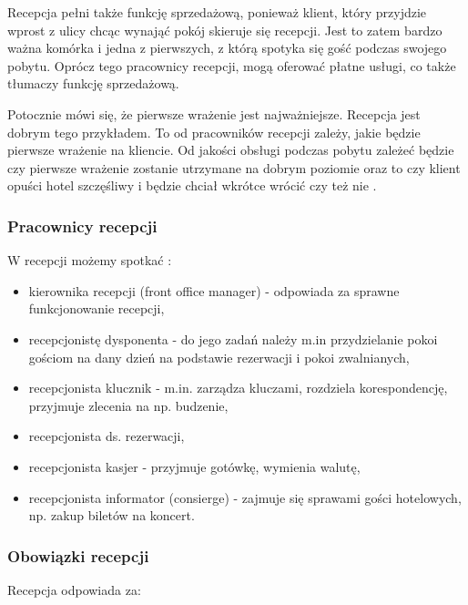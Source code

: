 \documentclass[a4paper,onecolumn,oneside,11pt,wide,floatssmall]{mwrep}
\theoremstyle{definition}
\theoremstyle{plain}%
\theoremstyle{remark}
\begin{document}
Recepcja pełni także funkcję sprzedażową, ponieważ klient, 
który przyjdzie wprost z ulicy chcąc wynająć pokój skieruje się recepcji. 
Jest to zatem  bardzo ważna komórka i jedna z pierwszych, z którą spotyka 
się gość podczas swojego pobytu. Oprócz tego pracownicy recepcji, mogą 
oferować płatne usługi, co także tłumaczy funkcję sprzedażową.

Potocznie mówi się, że pierwsze wrażenie jest najważniejsze. Recepcja jest 
dobrym tego przykładem. To od pracowników recepcji zależy, jakie będzie 
pierwsze wrażenie na kliencie. Od jakości obsługi podczas pobytu zależeć 
będzie czy pierwsze wrażenie zostanie utrzymane na dobrym poziomie oraz to 
czy klient opuści hotel szczęśliwy i będzie chciał wkrótce wrócić czy też nie
.


\subsubsection{Pracownicy recepcji}
W recepcji możemy spotkać \cite[str. 47-51]{OrgaDzialHot}:

\begin{itemize}
  \item kierownika recepcji (front office manager) - odpowiada za sprawne 
  funkcjonowanie recepcji,
  \item recepcjonistę dysponenta - do jego zadań należy m.in przydzielanie 
  pokoi gościom na dany dzień na podstawie rezerwacji i pokoi zwalnianych,
  \item recepcjonista klucznik - m.in. zarządza kluczami, rozdziela 
  korespondencję, przyjmuje zlecenia na np. budzenie,
  \item recepcjonista ds. rezerwacji,
  \item recepcjonista kasjer - przyjmuje gotówkę, wymienia walutę,
  \item recepcjonista informator (consierge) - zajmuje się sprawami gości 
  hotelowych, np. zakup biletów na koncert.
\end{itemize}

\subsubsection{Obowiązki recepcji} 
Recepcja odpowiada za\cite[str. 50]{OrgaDzialHot}:
\end{document}
